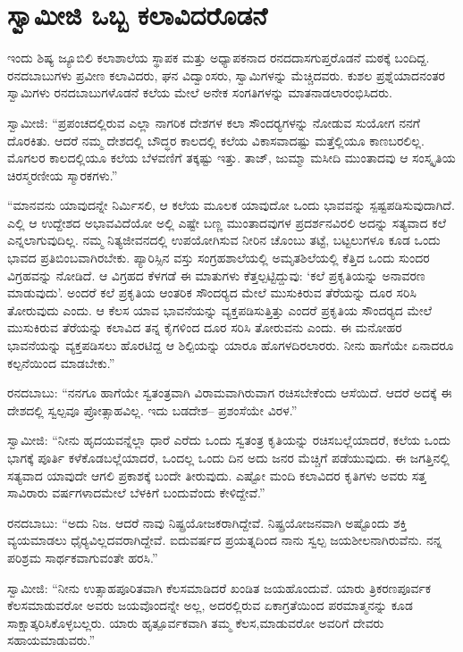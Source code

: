
\chapter{ಸ್ವಾಮೀಜಿ ಒಬ್ಬ ಕಲಾವಿದರೊಡನೆ}

 ಇಂದು ಶಿಷ್ಯ ಜ್ಯೂಬಿಲಿ ಕಲಾಶಾಲೆಯ ಸ್ಥಾಪಕ ಮತ್ತು ಅಧ್ಯಾಪಕನಾದ ರನದದಾಸಗುಪ್ತರೊಡನೆ ಮಠಕ್ಕೆ ಬಂದಿದ್ದ. ರನದಬಾಬುಗಳು ಪ್ರವೀಣ ಕಲಾವಿದರು, ಘನ ವಿದ್ವಾಂಸರು, ಸ್ವಾಮಿಗಳನ್ನು ಮೆಚ್ಚಿದವರು. ಕುಶಲ ಪ್ರಶ್ನೆಯಾದನಂತರ ಸ್ವಾಮಿಗಳು ರನದಬಾಬುಗಳೊಡನೆ ಕಲೆಯ ಮೇಲೆ ಅನೇಕ ಸಂಗತಿಗಳನ್ನು ಮಾತನಾಡಲಾರಂಭಿಸಿದರು. 

 ಸ್ವಾಮೀಜಿ: “ಪ್ರಪಂಚದಲ್ಲಿರುವ ಎಲ್ಲಾ ನಾಗರಿಕ ದೇಶಗಳ ಕಲಾ ಸೌಂದರ‍್ಯ\-ಗಳನ್ನು ನೋಡುವ ಸುಯೋಗ ನನಗೆ ದೊರಕಿತು. ಆದರೆ ನಮ್ಮ ದೇಶದಲ್ಲಿ ಬೌದ್ಧರ ಕಾಲದಲ್ಲಿ ಕಲೆಯ ವಿಕಾಸವಾದಷ್ಟು ಮತ್ತೆಲ್ಲಿಯೂ ಕಾಣಬರಲಿಲ್ಲ. ಮೊಗಲರ ಕಾಲದಲ್ಲಿಯೂ ಕಲೆಯ ಬೆಳವಣಿಗೆ ತಕ್ಕಷ್ಟು ಇತ್ತು. ತಾಜ್, ಜುಮ್ಮಾ ಮಸೀದಿ ಮುಂತಾದವು ಆ ಸಂಸ್ಕೃತಿಯ ಚಿರಸ್ಮರಣೀಯ ಸ್ಮಾರಕಗಳು.” 

 “ಮಾನವನು ಯಾವುದನ್ನೇ ನಿರ್ಮಿಸಲಿ, ಆ ಕಲೆಯ ಮೂಲಕ ಯಾವುದೋ ಒಂದು ಭಾವವನ್ನು ಸ್ಪಷ್ಟಪಡಿಸುವುದಾಗಿದೆ. ಎಲ್ಲಿ ಆ ಉದ್ದೇಶದ ಅಭಾವವಿದೆಯೋ ಅಲ್ಲಿ ಎಷ್ಟೇ ಬಣ್ಣ ಮುಂತಾದವುಗಳ ಪ್ರದರ್ಶನವಿರಲಿ ಅದನ್ನು ಸತ್ಯವಾದ ಕಲೆ ಎನ್ನಲಾಗುವುದಿಲ್ಲ. ನಮ್ಮ ನಿತ್ಯಜೀವನದಲ್ಲಿ ಉಪಯೋಗಿಸುವ ನೀರಿನ ಚೊಂಬು ತಟ್ಟೆ, ಬಟ್ಟಲುಗಳೂ ಕೂಡ ಒಂದು ಭಾವದ ಪ್ರತಿಬಿಂಬವಾಗಿರಬೇಕು. ಪ್ಯಾರಿಸ್ಸಿನ ವಸ್ತು ಸಂಗ್ರಹಶಾಲೆಯಲ್ಲಿ ಅಮೃತಶಿಲೆಯಲ್ಲಿ ಕೆತ್ತಿದ ಒಂದು ಸುಂದರ ವಿಗ್ರಹವನ್ನು ನೋಡಿದೆ. ಆ ವಿಗ್ರಹದ ಕೆಳಗಡೆ ಈ ಮಾತುಗಳು ಕೆತ್ತಲ್ಪಟ್ಟಿದ್ದುವು: ‘ಕಲೆ ಪ್ರಕೃತಿಯನ್ನು ಅನಾವರಣ ಮಾಡುವುದು’. ಅಂದರೆ ಕಲೆ ಪ್ರಕೃತಿಯ ಆಂತರಿಕ ಸೌಂದರ‍್ಯದ ಮೇಲೆ ಮುಸುಕಿರುವ ತೆರೆಯನ್ನು ದೂರ ಸರಿಸಿ ತೋರುವುದು ಎಂದು. ಆ ಕೆಲಸ ಯಾವ ಭಾವನೆಯನ್ನು ವ್ಯಕ್ತಪಡಿಸುತ್ತಿತ್ತು ಎಂದರೆ ಪ್ರಕೃತಿಯ ಸೌಂದರ‍್ಯದ ಮೇಲೆ ಮುಸುಕಿರುವ ತೆರೆಯನ್ನು ಕಲಾವಿದ ತನ್ನ ಕೈಗಳಿಂದ ದೂರ ಸರಿಸಿ ತೋರುವನು ಎಂದು. ಈ ಮನೋಹರ ಭಾವನೆಯನ್ನು ವ್ಯಕ್ತಪಡಿಸಲು ಹೊರಟಿದ್ದ ಆ ಶಿಲ್ಪಿಯನ್ನು ಯಾರೂ ಹೊಗಳದಿರಲಾರರು. ನೀನು ಹಾಗೆಯೇ ಏನಾದರೂ ಕಲ್ಪನೆಯಿಂದ ಮಾಡಬೇಕು.” 

 ರನದಬಾಬು: “ನನಗೂ ಹಾಗೆಯೇ ಸ್ವತಂತ್ರವಾಗಿ ವಿರಾಮವಾಗಿರುವಾಗ ರಚಿಸಬೇಕೆಂದು ಆಸೆಯಿದೆ. ಆದರೆ ಅದಕ್ಕೆ ಈ ದೇಶದಲ್ಲಿ ಸ್ವಲ್ಪವೂ ಪ್ರೋತ್ಸಾಹವಿಲ್ಲ. ಇದು ಬಡದೇಶ– ಪ್ರಶಂಸೆಯೇ ವಿರಳ.” 

 ಸ್ವಾಮೀಜಿ: “ನೀನು ಹೃದಯವನ್ನೆಲ್ಲಾ ಧಾರೆ ಎರೆದು ಒಂದು ಸ್ವತಂತ್ರ ಕೃತಿಯನ್ನು ರಚಿಸಬಲ್ಲೆಯಾದರೆ, ಕಲೆಯ ಒಂದು ಭಾಗಕ್ಕೆ ಪೂರ್ತಿ ಕಳೆಕೊಡಬಲ್ಲೆಯಾದರೆ, ಒಂದಲ್ಲ ಒಂದು ದಿನ ಅದು ಜನರ ಮೆಚ್ಚಿಗೆ ಪಡೆಯುವುದು. ಈ ಜಗತ್ತಿನಲ್ಲಿ ಸತ್ಯವಾದ ಯಾವುದೇ ಆಗಲಿ ಪ್ರಕಾಶಕ್ಕೆ ಬಂದೇ ತೀರುವುದು. ಎಷ್ಟೋ ಮಂದಿ ಕಲಾವಿದರ ಕೃತಿಗಳು ಅವರು ಸತ್ತ ಸಾವಿರಾರು ವರ್ಷಗಳಾದಮೇಲೆ ಬೆಳಕಿಗೆ ಬಂದುವೆಂದು ಕೇಳಿದ್ದೇವೆ.” 

 ರನದಬಾಬು: “ಅದು ನಿಜ. ಆದರೆ ನಾವು ನಿಷ್ಪ್ರಯೋಜಕರಾಗಿದ್ದೇವೆ. ನಿಷ್ಪ್ರಯೋಜನವಾಗಿ ಅಷ್ಟೊಂದು ಶಕ್ತಿ ವ್ಯಯಮಾಡಲು ಧೈರ‍್ಯವಿಲ್ಲದವರಾಗಿದ್ದೇವೆ. ಐದುವರ್ಷದ ಪ್ರಯತ್ನದಿಂದ ನಾನು ಸ್ವಲ್ಪ ಜಯಶೀಲನಾಗಿರುವೆನು. ನನ್ನ ಪರಿಶ್ರಮ ಸಾರ್ಥಕವಾಗುವಂತೇ ಹರಸಿ.” 

 ಸ್ವಾಮೀಜಿ: “ನೀನು ಉತ್ಸಾಹಪೂರಿತವಾಗಿ ಕೆಲಸಮಾಡಿದರೆ ಖಂಡಿತ ಜಯಹೊಂದುವೆ. ಯಾರು ತ್ರಿಕರಣಪೂರ್ವಕ ಕೆಲಸಮಾಡುವರೋ ಅವರು ಜಯವೊಂದನ್ನೇ ಅಲ್ಲ, ಅದರಲ್ಲಿರುವ ಏಕಾಗ್ರತೆಯಿಂದ ಪರಮಾತ್ಮನನ್ನು ಕೂಡ ಸಾಕ್ಷಾತ್ಕರಿಸಿಕೊಳ್ಳಬಲ್ಲರು. ಯಾರು ಹೃತ್ಪೂರ್ವಕವಾಗಿ ತಮ್ಮ ಕೆಲಸ,ಮಾಡುವರೋ ಅವರಿಗೆ ದೇವರು ಸಹಾಯಮಾಡುವರು.” 

